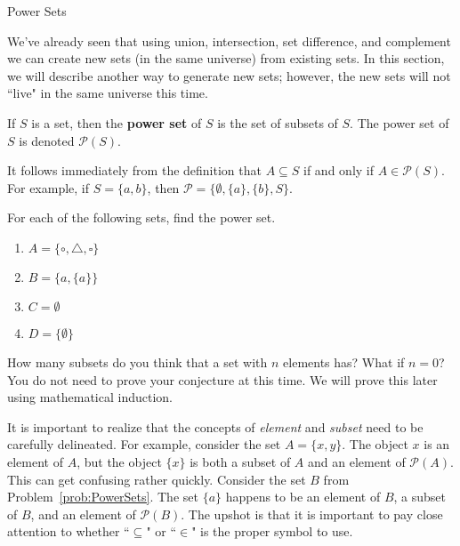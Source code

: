 \begin{section}{Power Sets}\label{sec:PowerSets}

We've already seen that using union, intersection, set difference, and complement we can create new sets (in the same universe) from existing sets.  In this section, we will describe another way to generate new sets; however, the new sets will not ``live" in the same universe this time.

\begin{definition}
If $S$ is a set, then the \textbf{power set} of $S$ is the set of subsets of $S$.  The power set of $S$ is denoted $\boxed{\mathcal{P}(S)}$.
\end{definition}

It follows immediately from the definition that $A\subseteq S$ if and only if $A\in\mathcal{P}(S)$.  For example, if $S=\{a,b\}$, then $\mathcal{P}=\{\emptyset, \{a\}, \{b\}, S\}$.

\begin{problem}\label{prob:PowerSets}
For each of the following sets, find the power set.
\begin{multicols}{2}
\begin{enumerate}[label=\textrm{(\alph*)}]
\item $A=\{\circ, \triangle, \square\}$
\item $B=\{a,\{a\}\}$
\item $C=\emptyset$
\item $D=\{\emptyset\}$
\end{enumerate}
\end{multicols}
\end{problem}

\begin{problem}\label{conjecture:PowerSets}
How many subsets do you think that a set with $n$ elements has?  What if $n=0$?  You do not need to prove your conjecture at this time.  We will prove this later using mathematical induction.
\end{problem}

It is important to realize that the concepts of \emph{element} and \emph{subset} need to be carefully delineated.  For example, consider the set $A=\{x,y\}$.  The object $x$ is an element of $A$, but the object $\{x\}$ is both a subset of $A$ and an element of $\mathcal{P}(A)$.  This can get confusing rather quickly.  Consider the set $B$ from Problem~\ref{prob:PowerSets}.  The set $\{a\}$ happens to be an element of $B$, a subset of $B$, and an element of  $\mathcal{P}(B)$. The upshot is that it is important to pay close attention to whether ``$\subseteq$" or ``$\in$" is the proper symbol to use.


\end{section}
